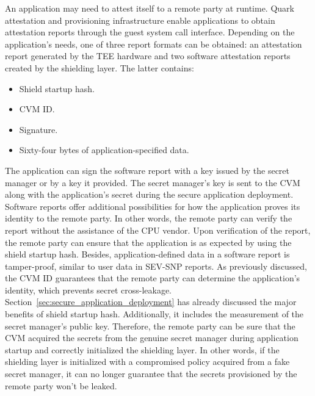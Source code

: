 An application may need to attest itself to a remote party at runtime. Quark attestation and provisioning infrastructure enable applications to obtain attestation reports through the guest system call interface. Depending on the application's needs, one of three report formats can be 
obtained: an attestation report generated by the \acrshort{TEE} hardware and two software attestation reports created by the shielding layer. The latter contains:

\begin{itemize}
    \item Shield startup hash.
    \item \acrshort{CVM} ID.
    \item Signature.
    \item Sixty-four bytes of application-specified data.
\end{itemize}

The application can sign the software report with a key issued by the secret manager or by a key it provided. The secret manager's key is sent to the \acrshort{CVM} along with the application's secret during the secure application deployment. Software reports offer additional possibilities 
for how the application proves its identity to the remote party. In other words, the remote party can verify the report without the assistance of the CPU vendor. Upon verification of the report, the remote party can ensure that the application is as expected by using the shield startup 
hash. Besides, application-defined data in a software report is tamper-proof, similar to user data in SEV-SNP reports. As previously discussed, the \acrshort{CVM} ID guarantees that the remote party can determine the application's identity, which prevents secret cross-leakage. Section~\ref{sec:secure_application_deployment} has already discussed the major 
benefits of shield startup hash. Additionally, it includes the measurement of the secret manager's public key. Therefore, the remote party can be sure that the \acrshort{CVM} acquired the secrets from the genuine secret manager during application startup and 
correctly initialized the shielding layer. In other words, if the shielding layer is initialized with a compromised policy acquired from a fake secret manager, it can no longer guarantee that the secrets provisioned by the remote party won't be leaked.


